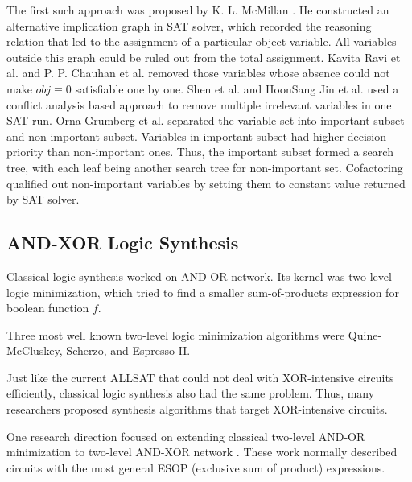 \documentclass[journal]{IEEEtran}
\begin{document}
The first such approach was proposed by K. L. McMillan \cite{SATUNBMC}.
He constructed an alternative implication graph in SAT solver,
which recorded the reasoning relation that led to the assignment of a particular object variable.
All variables outside this graph could be ruled out from the total assignment.
Kavita Ravi et al.\cite{MINASS} and P. P. Chauhan et al.\cite{REPARAM} removed those variables whose absence could not make $obj\equiv 0$ satisfiable one by one.
Shen et al.\cite{MINCEX} and HoonSang Jin et al.\cite{PRIMECLAUSE,EFFCON} used a conflict analysis based approach
to remove multiple irrelevant variables in one SAT run.
Orna Grumberg et al.\cite{MEMEFFALLSAT} separated the variable set into important subset and non-important subset.
Variables in important subset had higher decision priority than non-important ones.
Thus,
the important subset formed a search tree,
with each leaf being another search tree for non-important set.
Cofactoring \cite{EFFSATUSMCCO} qualified out non-important variables by setting them to constant value returned by SAT solver.

\subsection{AND-XOR Logic Synthesis}

Classical logic synthesis worked on AND-OR network.
Its kernel was two-level logic minimization,
which tried to find a smaller sum-of-products expression for boolean function $f$.

Three most well known two-level logic minimization algorithms were Quine-McCluskey\cite{McCluskey},
Scherzo\cite{Scherzo},
and Espresso-II\cite{Espresso}.

Just like the current ALLSAT that could not deal with XOR-intensive circuits efficiently,
classical logic synthesis also had the same problem.
Thus,
many researchers proposed synthesis algorithms that target XOR-intensive circuits.

One research direction focused on extending classical two-level AND-OR minimization to two-level AND-XOR network \cite{Mod2sum,ANDEXOR}.
These work normally described circuits with the most general ESOP (exclusive sum of product) expressions.
\end{document}
